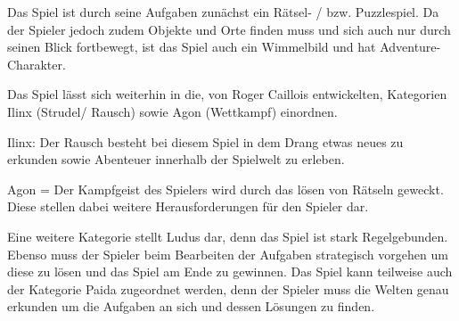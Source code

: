 
Das Spiel ist durch seine Aufgaben zunächst ein Rätsel- / bzw. Puzzlespiel. Da der Spieler jedoch zudem Objekte und Orte finden muss und sich auch nur durch seinen Blick fortbewegt, ist das Spiel auch ein Wimmelbild und hat Adventure-Charakter.

Das Spiel lässt sich weiterhin in die, von Roger Caillois entwickelten, Kategorien Ilinx (Strudel/ Rausch) sowie Agon (Wettkampf) einordnen. 

Ilinx: Der Rausch besteht bei diesem Spiel in dem Drang etwas neues zu erkunden sowie Abenteuer innerhalb der Spielwelt zu erleben.

Agon = Der Kampfgeist des Spielers wird durch das lösen von Rätseln geweckt. Diese stellen dabei weitere Herausforderungen für den Spieler dar.

Eine weitere Kategorie stellt Ludus dar, denn das Spiel ist stark Regelgebunden. Ebenso muss der Spieler beim Bearbeiten der Aufgaben strategisch vorgehen um diese zu lösen und das Spiel am Ende zu gewinnen. Das Spiel kann teilweise auch der Kategorie Paida zugeordnet werden, denn der Spieler muss die Welten genau erkunden um die Aufgaben an sich und dessen Lösungen zu finden.